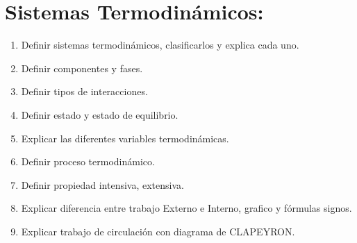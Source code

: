 \documentclass[../main]{subfiles}
\begin{document}
\chapter{Sistemas Termodinámicos:}


\begin{enumerate}
    \item Definir sistemas termodinámicos, clasificarlos y explica cada uno.
    \item Definir componentes y fases.
    \item Definir tipos de interacciones.
    \item Definir estado y estado de equilibrio.
    \item Explicar las diferentes variables termodinámicas.
    \item Definir proceso termodinámico.
    \item Definir propiedad intensiva, extensiva.
    \item Explicar diferencia entre trabajo Externo e Interno, grafico y fórmulas signos.
    \item Explicar trabajo de circulación con diagrama de CLAPEYRON.
    
\end{enumerate}
\end{document}
